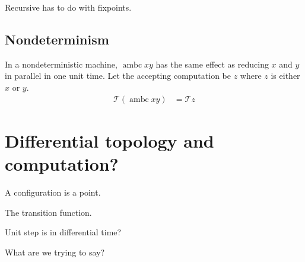 \documentclass[10pt,statementpaper]{memoir}
\theoremstyle{definition}
\newcommand\TC{\mathcal{T}}
\newcommand\ambc{\operatorname{ambc}}
\begin{document}
Recursive has to do with fixpoints.

\section{Nondeterminism}

In a nondeterministic machine, $\ambc x y$
has the same effect as reducing $x$ and $y$ in parallel in one unit time.
Let the accepting computation be $z$ where $z$ is either $x$ or $y$.
\begin{align}
    \TC(\ambc xy) &= \TC z
\end{align}

\chapter{Differential topology and computation?}

A configuration is a point.

The transition function.

Unit step is in differential time?

What are we trying to say?



\backmatter


\end{document}
